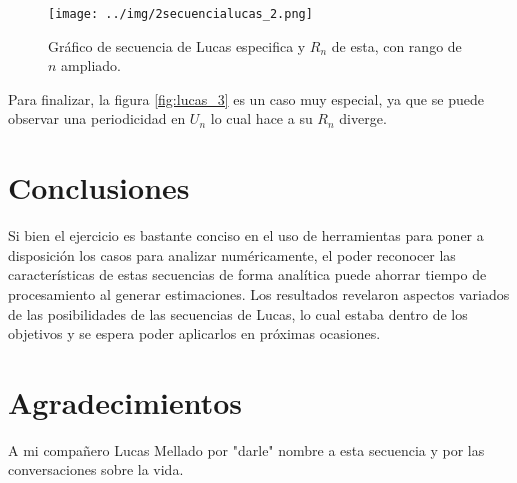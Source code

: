 \documentclass[../portafolio.tex]{subfiles}
\begin{document}
\begin{figure}
\centering
\texttt{[image: ../img/2secuencialucas\_2.png]} 
\caption{Gráfico de secuencia de Lucas especifica y $R_n$ de esta, con rango de $n$ ampliado.}\label{fig:lucas_22}
\end{figure}

Para finalizar, la figura \ref{fig:lucas_3} es un caso muy especial, ya que se puede observar una periodicidad en $U_n$ lo cual hace a su $R_n$ diverge.

\section*{Conclusiones}

Si bien el ejercicio es bastante conciso en el uso de herramientas para poner a disposición los casos para analizar numéricamente, el poder reconocer las características de estas secuencias de forma analítica puede ahorrar tiempo de procesamiento al generar estimaciones. Los resultados revelaron aspectos variados de las posibilidades de las secuencias de Lucas, lo cual estaba dentro de los objetivos y se espera poder aplicarlos en próximas ocasiones.

\section*{Agradecimientos}
A mi compañero Lucas Mellado por "darle" nombre a esta secuencia y por las conversaciones sobre la vida.
\end{document}
